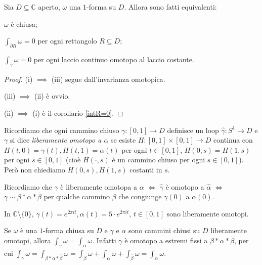\begin{thm}
  Sia $D \subseteq \mathbb{C}$ aperto, $\omega$ una $1$-forma su $D$. Allora sono fatti equivalenti:
  \begin{nlist}
    \item $\omega$ è chiusa;
    \item $\displaystyle \int_{\partial R} \omega=0$ per ogni rettangolo $R \subseteq D$;
    \item $\displaystyle \int_{\gamma}\omega=0$ per ogni laccio continuo omotopo al laccio costante.
  \end{nlist}
\end{thm}

\begin{proof}
  (i) $\implies$ (iii) segue dall'invarianza omotopica.

  (iii) $\implies$ (ii) è ovvio.

  (ii) $\implies$ (i) è il corollario \ref{intR=0}.
\end{proof}

\begin{defn}
  Ricordiamo che ogni cammino chiuso $\gamma:[0, 1] \longrightarrow D$ definisce un loop $\hat{\gamma}:S^1 \longrightarrow D$ e $\gamma$ si dice \textit{liberamente omotopo a $\alpha$} se esiste $H:[0,1]\times[0,1] \longrightarrow D$ continua con $H(t,0)=\gamma(t), H(t,1)=\alpha(t)$ per ogni $t \in [0,1]$, $H(0, s)=H(1,s)$ per ogni $s \in [0,1]$
  (cioè $H(\cdot, s)$ è un cammino chiuso per ogni $s \in[0,1]$). Però non chiediamo $H(0,s),H(1,s)$ costanti in $s$.
\end{defn}

Ricordiamo che $\gamma$ è liberamente omotopa a $\alpha$ $\iff$ $\hat{\gamma}$ è omotopo a $\hat{\alpha}$ $\iff$ $\gamma \sim \beta*\alpha*\bar{\beta}$ per qualche cammino $\beta$ che congiunge $\gamma(0)$ a $\alpha(0)$.

\begin{ex}
  In $\mathbb{C}\setminus\{0\}$, $\gamma(t)=e^{2\pi it}, \alpha(t)=5\cdot e^{2\pi i t}$, $t \in [0,1]$ sono liberamente omotopi.
\end{ex}

\begin{ftt}
  Se $\omega$ è una $1$-forma chiusa su $D$ e $\gamma$ e $\alpha$ sono cammini chiusi su $D$ liberamente omotopi, allora $\displaystyle \int_{\gamma} \omega=\int_{\alpha}\omega$.
  Infatti $\gamma$ è omotopo a estremi fissi a $\beta*\alpha*\bar{\beta}$, per cui $\displaystyle \int_{\gamma} \omega=\int_{\beta*\alpha*\bar{\beta}} \omega=\int_{\beta}\omega+\int_{\alpha}\omega+\int_{\bar{\beta}}\omega=\int_{\alpha}\omega$.
\end{ftt}
